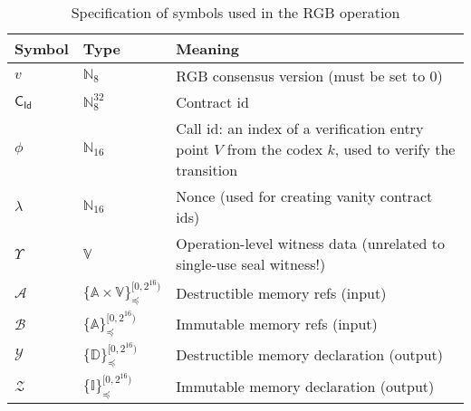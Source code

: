 \documentclass[9pt,oneside]{amsart}
\begin{document}
\begin{table}[h]
\centering
\caption{Specification of symbols used in the RGB operation}\label{tab:op}
\begin{tabular}{ l l l }
\toprule
Symbol & Type & Meaning \\
\midrule
$v$ & $\mathbb{N}_8$ & RGB consensus version (must be set to $0$) \\
$\mathsf{C_{Id}}$ & $\mathbb{N}_8^{32}$ & Contract id \\
$\phi$ & $\mathbb{N}_{16}$ & Call id: an index of a verification entry point $V$ from the codex $k$, used to verify the transition \\
$\lambda$ & $\mathbb{N}_{16}$ & Nonce (used for creating vanity contract ids) \\
$\Upsilon$ & $\mathbb{V}$ & Operation-level witness data (unrelated to single-use seal witness!) \\
$\mathcal{A}$ & $\{\mathbb{A} \times \mathbb{V}\}_\preceq^{[0, 2^{16})}$ & Destructible memory refs (input) \\
$\mathcal{B}$ & $\{\mathbb{A}\}_\preceq^{[0, 2^{16})}$ & Immutable memory refs (input) \\
$\mathcal{Y}$ & $\{\mathbb{D}\}_\preceq^{[0, 2^{16})}$ & Destructible memory declaration (output) \\
$\mathcal{Z}$ & $\{\mathbb{I}\}_\preceq^{[0, 2^{16})}$ & Immutable memory declaration (output) \\
\bottomrule
\end{tabular}
\end{table}
\end{document}
